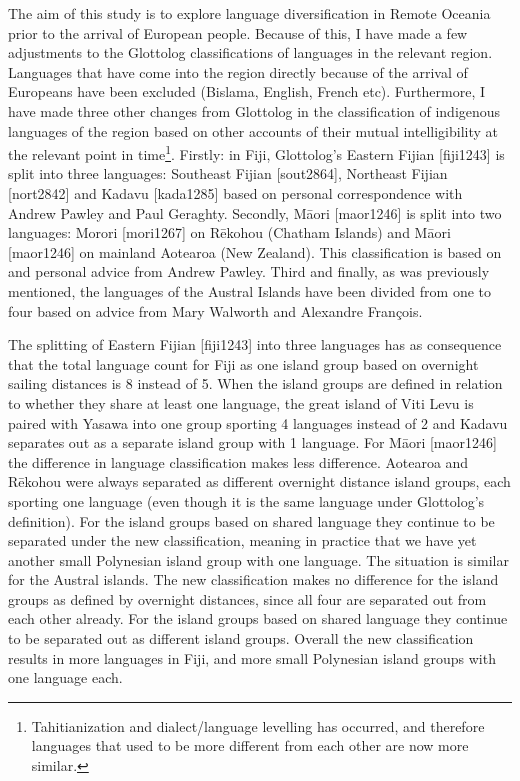 \documentclass[unnumsec,webpdf,modern,medium]{oup-authoring-template}
\begin{document}
\begin{appendices}
The aim of this study is to explore language diversification in Remote Oceania prior to the arrival of European people. Because of this, I have made a few adjustments to the Glottolog classifications of languages in the relevant region. Languages that have come into the region directly because of the arrival of Europeans have been excluded (Bislama, English, French etc). Furthermore, I have made three other changes from Glottolog in the classification of indigenous languages of the region based on other accounts of their mutual intelligibility at the relevant point in time\footnote{Tahitianization and dialect/language levelling has occurred, and therefore languages that used to be more different from each other are now more similar.}. Firstly: in Fiji, Glottolog's Eastern Fijian [fiji1243] is split into three languages: Southeast Fijian [sout2864], Northeast Fijian [nort2842] and Kadavu [kada1285] based on personal correspondence with Andrew Pawley and Paul Geraghty. Secondly, M\={a}ori [maor1246] is split into two languages: Morori [mori1267] on R\={e}kohou (Chatham Islands) and M\={a}ori [maor1246] on mainland Aotearoa (New Zealand). This classification is based on \citet{harlow1973regional} and personal advice from Andrew Pawley. Third and finally, as was previously mentioned, the languages of the Austral Islands have been divided from one to four based on advice from Mary Walworth and Alexandre François.

The splitting of Eastern Fijian [fiji1243] into three languages has as consequence that the total language count for Fiji as one island group based on overnight sailing distances is 8 instead of 5. When the island groups are defined in relation to whether they share at least one language, the great island of Viti Levu is paired with Yasawa into one group sporting 4 languages instead of 2 and Kadavu separates out as a separate island group with 1 language. For M\={a}ori [maor1246] the difference in language classification makes less difference. Aotearoa and  R\={e}kohou were always separated as different overnight distance island groups, each sporting one language (even though it is the same language under Glottolog's definition). For the island groups based on shared language they continue to be separated under the new classification, meaning in practice that we have yet another small Polynesian island group with one language. The situation is similar for the Austral islands. The new classification makes no difference for the island groups as defined by overnight distances, since all four are separated out from each other already. For the island groups based on shared language they continue to be separated out as different island groups. Overall the new classification results in more languages in Fiji, and more small Polynesian island groups with one language each.



\end{appendices}
\end{document}
